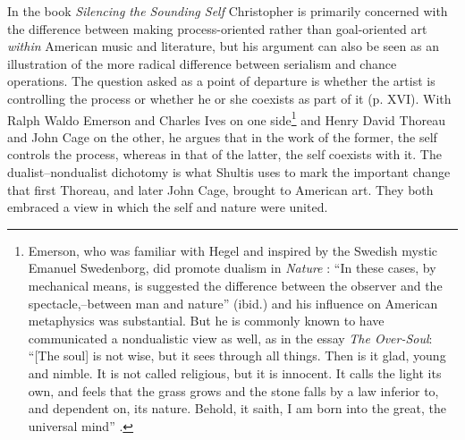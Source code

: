\documentclass[a4paper]{article}
\begin{document}
In the book \emph{Silencing the Sounding Self} Christopher \citet{shultis98} is primarily concerned with the difference between making process-oriented rather than goal-oriented art \emph{within} American music and literature, but his argument can also be seen as an illustration of the more radical difference between serialism and chance operations. The question asked as a point of departure is whether the artist is controlling the process or whether he or she coexists as part of it (p. XVI). With Ralph Waldo Emerson and Charles Ives on one side\footnote{Emerson, who was familiar with Hegel and inspired by the Swedish mystic Emanuel Swedenborg, did promote dualism in \emph{Nature} \citep[e.g. ch. 6, `Idealism'][]{emerson2001}: ``In these cases, by mechanical means, is suggested the difference between the observer and the spectacle,--between man and nature'' (ibid.) and his influence on American metaphysics was substantial. But  he is commonly known to have communicated a nondualistic view as well, as in the essay \emph{The Over-Soul}: ``[The soul] is not wise, but it sees through all things. Then is it glad, young and nimble. It is not called religious, but it is innocent. It calls the light its own, and feels that the grass grows and the stone falls by a law inferior to, and dependent on, its nature. Behold, it saith, I am born into the great, the universal mind''  \citep[p. 250]{emerson2000}.} and Henry David Thoreau and John Cage on the other, he argues that in the work of the former, the self controls the process, whereas in that of the latter, the self coexists with it. The dualist--nondualist dichotomy is what Shultis uses to mark the important change that first Thoreau, and later John Cage, brought to American art. They both embraced a view in which the self and nature were united. 
\end{document}
